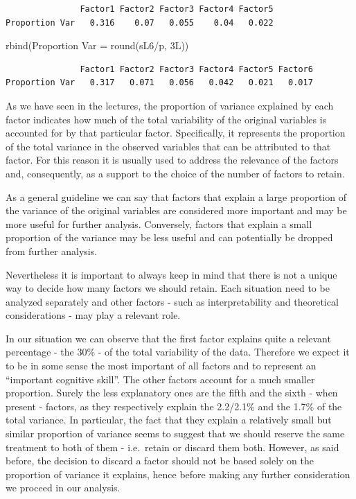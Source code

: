 \documentclass[
  letterpaper,
  DIV=11,
  numbers=noendperiod]{scrartcl}
\newenvironment{Shaded}{\begin{snugshade}}{\end{snugshade}}
\newcommand{\AttributeTok}[1]{\textcolor[rgb]{0.40,0.45,0.13}{#1}}
\newcommand{\FunctionTok}[1]{\textcolor[rgb]{0.28,0.35,0.67}{#1}}
\newcommand{\NormalTok}[1]{\textcolor[rgb]{0.00,0.23,0.31}{#1}}
\newcommand{\OtherTok}[1]{\textcolor[rgb]{0.00,0.23,0.31}{#1}}
\newcommand{\SpecialCharTok}[1]{\textcolor[rgb]{0.37,0.37,0.37}{#1}}
\newcommand{\StringTok}[1]{\textcolor[rgb]{0.13,0.47,0.30}{#1}}
\begin{document}
\begin{verbatim}
               Factor1 Factor2 Factor3 Factor4 Factor5
Proportion Var   0.316    0.07   0.055    0.04   0.022
\end{verbatim}

\begin{Shaded}
\begin{Highlighting}[]
\FunctionTok{rbind}\NormalTok{(}\StringTok{\textasciigrave{}}\AttributeTok{Proportion Var}\StringTok{\textasciigrave{}} \OtherTok{=} \FunctionTok{round}\NormalTok{(sL6}\SpecialCharTok{/}\NormalTok{p, 3L))}
\end{Highlighting}
\end{Shaded}

\begin{verbatim}
               Factor1 Factor2 Factor3 Factor4 Factor5 Factor6
Proportion Var   0.317   0.071   0.056   0.042   0.021   0.017
\end{verbatim}

As we have seen in the lectures, the proportion of variance explained by
each factor indicates how much of the total variability of the original
variables is accounted for by that particular factor. Specifically, it
represents the proportion of the total variance in the observed
variables that can be attributed to that factor. For this reason it is
usually used to address the relevance of the factors and, consequently,
as a support to the choice of the number of factors to retain.

As a general guideline we can say that factors that explain a large
proportion of the variance of the original variables are considered more
important and may be more useful for further analysis. Conversely,
factors that explain a small proportion of the variance may be less
useful and can potentially be dropped from further analysis.

Nevertheless it is important to always keep in mind that there is not a
unique way to decide how many factors we should retain. Each situation
need to be analyzed separately and other factors - such as
interpretability and theoretical considerations - may play a relevant
role.

In our situation we can observe that the first factor explains quite a
relevant percentage - the 30\% - of the total variability of the data.
Therefore we expect it to be in some sense the most important of all
factors and to represent an ``important cognitive skill''. The other
factors account for a much smaller proportion. Surely the less
explanatory ones are the fifth and the sixth - when present - factors,
as they respectively explain the 2.2/2.1\% and the 1.7\% of the total
variance. In particular, the fact that they explain a relatively small
but similar proportion of variance seems to suggest that we should
reserve the same treatment to both of them - i.e.~retain or discard them
both. However, as said before, the decision to discard a factor should
not be based solely on the proportion of variance it explains, hence
before making any further consideration we proceed in our analysis.
\end{document}
